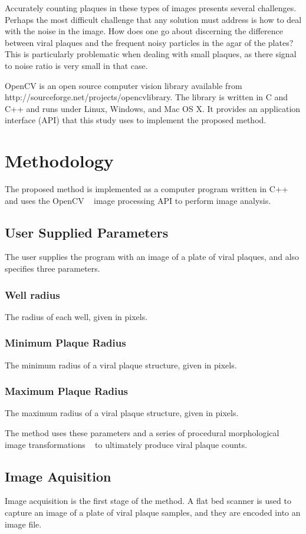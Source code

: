 \documentclass[11pt,final,twocolumn]{IEEEtran}
\begin{document}
Accurately counting plaques in these types of images presents several challenges. Perhaps the most difficult challenge that any solution must address is how to deal with the noise in the image.  How does one go about discerning the difference between viral plaques and the frequent noisy particles in the agar of the plates?  This is particularly problematic when dealing with small plaques, as there signal to noise ratio is very small in that case.  

OpenCV is an open source computer vision library available from http://sourceforge.net/projects/opencvlibrary. The library is written in C and C++ and runs under Linux, Windows, and Mac OS X. It provides an application interface (API) that this study uses to implement the proposed method. 


\section{Methodology}
The proposed method is implemented as a computer program written in C++ and uses the  OpenCV ~\cite{openCV} image processing API to perform image analysis. 

\subsection{User Supplied Parameters}
The user supplies the program with an image of a plate of viral plaques, and also specifies three parameters.
\subsubsection{Well radius}
The radius of each well, given in pixels.

\subsubsection{Minimum Plaque Radius}
 The minimum radius of a viral plaque structure, given in pixels.

\subsubsection{Maximum Plaque Radius}
 The maximum radius of a viral plaque structure, given in pixels.


The method uses these parameters and a series of procedural morphological image transformations ~\cite{morphological} to ultimately produce viral plaque counts.

\subsection{Image Aquisition}
Image acquisition  is the first stage of the method. A flat bed scanner is used to capture an image of a plate of viral plaque samples, and they are encoded into an image file. 
\end{document}
